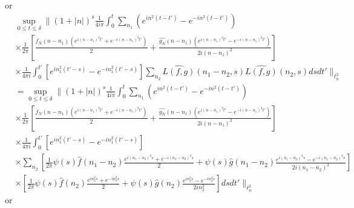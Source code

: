 \documentclass[12pt,reqno]{amsart}
\numberwithin{equation}{section}  %
\newcommand{\wh}{\widehat}
\begin{document}
or 
%
%
\begin{equation*}
\begin{split}
& \sup_{0 \le t \le \delta} \| (1 + | n |)^{s} \frac{1}{4 i \pi} 
  \int_{0}^{t} \sum_{n_{1}} \left( e^{in^{2}(t-t')} - e^{-in^{2}(t-t')} \right)
  \\
  & \times \frac{1}{2 \pi} \left[ \frac{\wh{f_{N}}(n - n_{1})\left( e^{i(n - n_{1})^{2}t'} +
  e^{-i(n - n_{1})^{2}t'} \right)}{2} + \frac{\wh{g_{N}}(n - n_{1})\left(
  e^{i(n - n_{1})^{2}t'} - e^{-i(n - n_{1})^{2}t'}
  \right)}{2i(n - n_{1})^{2}} \right]
  \\
  & \times \frac{1}{4 \pi i} \int_{0}^{t'} \left[ e^{in_{1}^{2}(t' -s)} -
  e^{-in_{1}^{2}(t' -s)} \right] \sum_{n_{2}} \wh{L(f, g)}(n_{1} - n_{2},s)
  \wh{L(f,g)}(n_{2},s) ds dt'  \|_{\ell^{2}_{n}}
  \\
 & = \sup_{0 \le t \le \delta} \| (1 + | n |)^{s} \frac{1}{4 i \pi} 
  \int_{0}^{t} \sum_{n_{1}} \left( e^{in^{2}(t-t')} - e^{-in^{2}(t-t')} \right)
  \\
  & \times \frac{1}{2 \pi} \left[ \frac{\wh{f_{N}}(n - n_{1})\left( e^{i(n - n_{1})^{2}t'} +
  e^{-i(n - n_{1})^{2}t'} \right)}{2} + \frac{\wh{g_{N}}(n - n_{1})\left(
  e^{i(n - n_{1})^{2}t'} - e^{-i(n - n_{1})^{2}t'}
  \right)}{2i(n - n_{1})^{2}} \right]
  \\
  & \times \frac{1}{4 \pi i} \int_{0}^{t'} \left[ e^{in_{1}^{2}(t' -s)} -
  e^{-in_{1}^{2}(t' -s)} \right]
  \\
  & \times \sum_{n_{2}} 
  \left[ \frac{1}{2 \pi} \psi(s) 
  \wh{f}(n_{1} - n_{2}) \frac{e^{i(n_{1} - n_{2})^{2}s} + e^{-i(n_{1} -
  n_{2})^{2}s}}{2} 
  + \psi(s) \wh{g}(n_{1} - n_{2})\frac{e^{i(n_{1} - n_{2})^{2}s} -
  e^{-i(n_{1} - n_{2})^{2}s}}{2 i (n_{1} - n_{2})^{2}} \right]
  \\
  & \times 
  \left[ \frac{1}{2 \pi} \psi(s) 
  \wh{f}(n_{2}) \frac{e^{in_{2}^{2}s} + e^{-in_{2}^{2}s}}{2} 
  + \psi(s) 
  \wh{g}(n_{2})\frac{e^{in_{2}^{2}s} - e^{-in_{2}^{2}s}}{2 i n_{2}^{2}} \right]
  ds dt'
  \|_{\ell^{2}_{n}}
\end{split}
\end{equation*}
%
%
or
%
%
\end{document}
